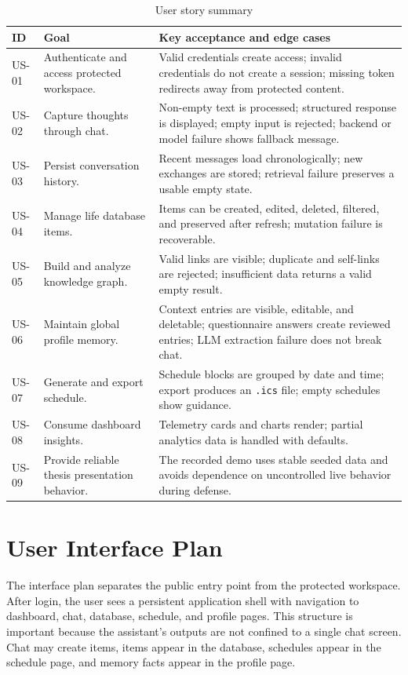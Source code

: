 \begin{longtable}{|p{}|p{}|p{}|}
\caption{User story summary}
\label{tab:user-stories}\\
\hline
\textbf{ID} & \textbf{Goal} & \textbf{Key acceptance and edge cases}\\
\hline
US-01 & Authenticate and access protected workspace. & Valid credentials create access; invalid credentials do not create a session; missing token redirects away from protected content.\\
\hline
US-02 & Capture thoughts through chat. & Non-empty text is processed; structured response is displayed; empty input is rejected; backend or model failure shows fallback message.\\
\hline
US-03 & Persist conversation history. & Recent messages load chronologically; new exchanges are stored; retrieval failure preserves a usable empty state.\\
\hline
US-04 & Manage life database items. & Items can be created, edited, deleted, filtered, and preserved after refresh; mutation failure is recoverable.\\
\hline
US-05 & Build and analyze knowledge graph. & Valid links are visible; duplicate and self-links are rejected; insufficient data returns a valid empty result.\\
\hline
US-06 & Maintain global profile memory. & Context entries are visible, editable, and deletable; questionnaire answers create reviewed entries; LLM extraction failure does not break chat.\\
\hline
US-07 & Generate and export schedule. & Schedule blocks are grouped by date and time; export produces an \texttt{.ics} file; empty schedules show guidance.\\
\hline
US-08 & Consume dashboard insights. & Telemetry cards and charts render; partial analytics data is handled with defaults.\\
\hline
US-09 & Provide reliable thesis presentation behavior. & The recorded demo uses stable seeded data and avoids dependence on uncontrolled live behavior during defense.\\
\hline
\end{longtable}

\section{User Interface Plan}

The interface plan separates the public entry point from the protected workspace. After login, the user sees a persistent application shell with navigation to dashboard, chat, database, schedule, and profile pages. This structure is important because the assistant's outputs are not confined to a single chat screen. Chat may create items, items appear in the database, schedules appear in the schedule page, and memory facts appear in the profile page.

